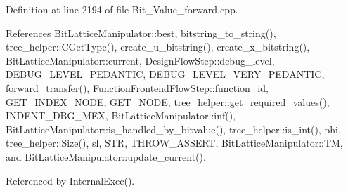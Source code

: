 Definition at line 2194 of file Bit\+\_\+\+Value\+\_\+forward.\+cpp.



References Bit\+Lattice\+Manipulator\+::best, bitstring\+\_\+to\+\_\+string(), tree\+\_\+helper\+::\+C\+Get\+Type(), create\+\_\+u\+\_\+bitstring(), create\+\_\+x\+\_\+bitstring(), Bit\+Lattice\+Manipulator\+::current, Design\+Flow\+Step\+::debug\+\_\+level, D\+E\+B\+U\+G\+\_\+\+L\+E\+V\+E\+L\+\_\+\+P\+E\+D\+A\+N\+T\+IC, D\+E\+B\+U\+G\+\_\+\+L\+E\+V\+E\+L\+\_\+\+V\+E\+R\+Y\+\_\+\+P\+E\+D\+A\+N\+T\+IC, forward\+\_\+transfer(), Function\+Frontend\+Flow\+Step\+::function\+\_\+id, G\+E\+T\+\_\+\+I\+N\+D\+E\+X\+\_\+\+N\+O\+DE, G\+E\+T\+\_\+\+N\+O\+DE, tree\+\_\+helper\+::get\+\_\+required\+\_\+values(), I\+N\+D\+E\+N\+T\+\_\+\+D\+B\+G\+\_\+\+M\+EX, Bit\+Lattice\+Manipulator\+::inf(), Bit\+Lattice\+Manipulator\+::is\+\_\+handled\+\_\+by\+\_\+bitvalue(), tree\+\_\+helper\+::is\+\_\+int(), phi, tree\+\_\+helper\+::\+Size(), sl, S\+TR, T\+H\+R\+O\+W\+\_\+\+A\+S\+S\+E\+RT, Bit\+Lattice\+Manipulator\+::\+TM, and Bit\+Lattice\+Manipulator\+::update\+\_\+current().



Referenced by Internal\+Exec().

